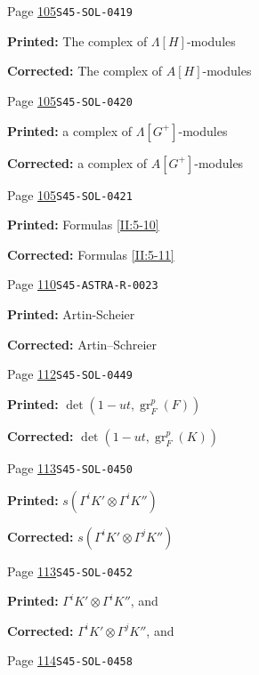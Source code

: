 \documentclass[oneside]{book}
\DeclareMathOperator{\gr}{gr}
\theoremstyle{sga-source}
\theoremstyle{sga-source-dash}
\theoremstyle{sga-source-dotdash}
\theoremstyle{sga-source-number-note-dash}
\theoremstyle{sga-source-note-number-dotdash}
\theoremstyle{sga-source-example-dotdash}
\theoremstyle{sga-source-inline-number}
\theoremstyle{sga-source-bare-number}
\theoremstyle{sga-source}
\begin{document}
\begin{description}
\smallskip
\item[\hypertarget{apparatus:EN-0043}{43}] Page \hyperlink{printpage:en:105}{105}\quad\texttt{S45-SOL-0419}
\par\noindent\textbf{Printed:} The complex of $\Lambda[H]$-modules
\par\noindent\textbf{Corrected:} The complex of $A[H]$-modules
\smallskip
\item[\hypertarget{apparatus:EN-0044}{44}] Page \hyperlink{printpage:en:105}{105}\quad\texttt{S45-SOL-0420}
\par\noindent\textbf{Printed:} a complex of $\Lambda[G^+]$-modules
\par\noindent\textbf{Corrected:} a complex of $A[G^+]$-modules
\smallskip
\item[\hypertarget{apparatus:EN-0045}{45}] Page \hyperlink{printpage:en:105}{105}\quad\texttt{S45-SOL-0421}
\par\noindent\textbf{Printed:} Formulas \ref{II:5-10}
\par\noindent\textbf{Corrected:} Formulas \ref{II:5-11}
\smallskip
\item[\hypertarget{apparatus:EN-0046}{46}] Page \hyperlink{printpage:en:110}{110}\quad\texttt{S45-ASTRA-R-0023}
\par\noindent\textbf{Printed:} Artin-Scheier
\par\noindent\textbf{Corrected:} Artin--Schreier
\smallskip
\item[\hypertarget{apparatus:EN-0047}{47}] Page \hyperlink{printpage:en:112}{112}\quad\texttt{S45-SOL-0449}
\par\noindent\textbf{Printed:} \(\det(1-u t,\gr_F^p(F))\)
\par\noindent\textbf{Corrected:} \(\det(1-u t,\gr_F^p(K))\)
\smallskip
\item[\hypertarget{apparatus:EN-0048}{48}] Page \hyperlink{printpage:en:113}{113}\quad\texttt{S45-SOL-0450}
\par\noindent\textbf{Printed:} \(s(\Gamma^i K'\otimes \Gamma^i K'')\)
\par\noindent\textbf{Corrected:} \(s(\Gamma^i K'\otimes \Gamma^j K'')\)
\smallskip
\item[\hypertarget{apparatus:EN-0049}{49}] Page \hyperlink{printpage:en:113}{113}\quad\texttt{S45-SOL-0452}
\par\noindent\textbf{Printed:} $\Gamma^i K'\otimes \Gamma^i K''$, and
\par\noindent\textbf{Corrected:} $\Gamma^i K'\otimes \Gamma^j K''$, and
\smallskip
\item[\hypertarget{apparatus:EN-0050}{50}] Page \hyperlink{printpage:en:114}{114}\quad\texttt{S45-SOL-0458}

\end{description}
\end{document}
